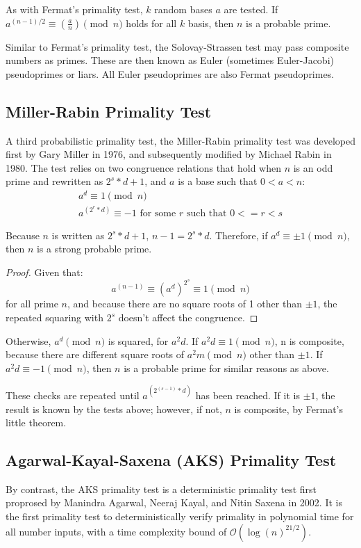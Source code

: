 \documentclass{article}
\begin{document}
As with Fermat's primality test, $k$ random bases $a$ are tested. If $a^{(n - 1) / 2} \equiv (\frac{a}{n}) \pmod{n}$ holds for all $k$ basis, then $n$ is a probable prime.

Similar to Fermat's primality test, the Solovay-Strassen test may pass composite numbers as primes. These are then known as Euler (sometimes Euler-Jacobi) pseudoprimes or liars. All Euler pseudoprimes are also Fermat pseudoprimes. 

\subsection{Miller-Rabin Primality Test} %
A third probabilistic primality test, the Miller-Rabin primality test was developed first by Gary Miller in 1976, and subsequently modified by Michael Rabin in 1980. The test relies on two congruence relations that hold when $n$ is an odd prime and rewritten as $2^s * d + 1$, and $a$ is a base such that $0 < a < n$:
\begin{gather*}
    a^d \equiv 1 \pmod{n} \\
    a^{(2^r * d)} \equiv -1 \text{ for some $r$ such that $0 <= r < s$}
\end{gather*}

Because $n$ is written as $2^s * d + 1$, $n - 1 = 2^s * d$. Therefore, if $a^d \equiv \pm 1 \pmod{n}$, then $n$ is a strong probable prime.

\begin{proof}
    Given that:
    \[
        a^{(n - 1)} \equiv (a^d)^{2^s} \equiv 1 \pmod{n}
    \]
    for all prime $n$, and because there are no square roots of 1 other than $\pm 1$, the repeated squaring with $2^s$ doesn't affect the congruence.
\end{proof}

Otherwise, $a^d \pmod{n}$ is squared, for $a^2d$. If $a^2d \equiv 1 \pmod{n}$, n is composite, because there are different square roots of $a^2m \pmod{n}$ other than $\pm 1$. If $a^2d \equiv -1 \pmod{n}$, then $n$ is a probable prime for similar reasons as above.

These checks are repeated until $a^{(2^{(s - 1)} * d)}$ has been reached. If it is $\pm 1$, the result is known by the tests above; however, if not, $n$ is composite, by Fermat's little theorem.

\subsection{Agarwal-Kayal-Saxena (AKS) Primality Test} %
\label{theory:aks}
By contrast, the AKS primality test is a deterministic primality test first proprosed by Manindra Agarwal, Neeraj Kayal, and Nitin Saxena in 2002. It is the first primality test to deterministically verify primality in polynomial time for all number inputs, with a time complexity bound of $\mathcal{O}(\log{(n)}^{21/2})$.
\end{document}
